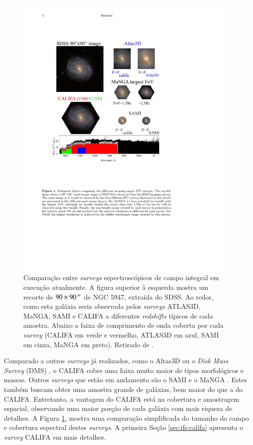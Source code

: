 \begin{figure}
	\includegraphics{figuras/surveysIFS}
	\caption[Comparação entre {\em surveys} espectroscópicos de campo integral]
	{Comparação entre {\em surveys} espectroscópicos de campo integral em execução
	atualmente. A figura superior à esquerda mostra um recorte de $90 \times
	90\,^{\prime\prime}$ de NGC 5947, extraída do SDSS. Ao redor, como esta galáxia seria
	observada pelos {\em surveys} ATLAS3D, MaNGA, SAMI e CALIFA a diferentes {\em
	redshifts} típicos de cada amostra. Abaixo a faixa de comprimento de onda
	coberta por cada {\em survey} (CALIFA em verde e vermelho, ATLAS3D em azul,
	SAMI em cinza, MaNGA em preto). Retirado de \citet{Sanchez2014}.}
	\label{fig:surveysIFS}
\end{figure}

Comparado a outros {\em surveys} já realizados, como o Altas3D
\citep{Cappellari2011} ou o {\em Disk Mass Survey} (DMS) \citep{Bershady2010}, o
CALIFA cobre uma faixa muito maior de tipos morfológicos e massas. Outros {\em
surveys} que estão em andamento são o SAMI \citep{Croom2012, Bryant2015} e o
MaNGA \citep{Bundy2015}. Estes também buscam obter uma amostra grande de
galáxias, bem maior do que a do CALIFA. Entretanto, a vantagem do CALIFA está na
cobertura e amostragem espacial, observando uma maior porção de cada galáxia com
mais riqueza de detalhes. A Figura \ref{fig:surveysIFS}, mostra uma comparação
simplificada do tamanho do campo e cobertura espectral destes {\em surveys}. A
primeira Seção \ref{sec:ifs:califa} apresenta o {\em survey} CALIFA em mais
detalhes.

